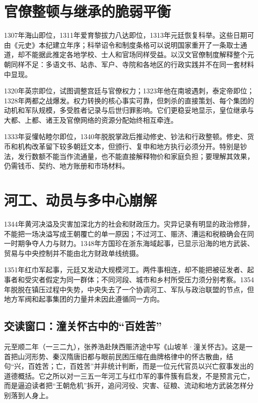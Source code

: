 \section{官僚整顿与继承的脆弱平衡}

1307年海山即位，1311年爱育黎拔力八达即位，1313年元廷恢复科举。这些日期可由《元史》本纪建立年序；科举诏令和制度条格可以说明国家重开了一条取士通道，却不能据此推定各地学校、士人和官场同样受益。以汉文官僚制度解释整个元朝同样不足：多语文书、站赤、军户、寺院和各地区的行政实践并不在同一套材料中显现。

1320年英宗即位，试图调整宫廷与官僚权力；1323年他在南坡遇刺，泰定帝即位；1328年两都之战爆发。权力转换的核心事实可靠，但刺杀的直接策划、每个集团的动机和军队规模，多受胜者记录与后世归罪影响。它们更稳妥地显示，皇位继承与大都、上都、诸王及官僚网络的资源分配始终相互牵连。

1333年妥懽帖睦尔即位，1340年脱脱掌政后推动修史、钞法和行政整顿。修史、货币和机构改革留下较多朝廷文本，但颁行、复申和地方执行必须分开。特别是钞法，发行数额不能当作流通量，也不能直接解释物价和家庭负担；要理解其效果，仍需钱币、契约、地方账册和市场材料。

\section{河工、动员与多中心崩解}

1344年黄河决溢及灾害加深北方的社会和财政压力。灾异记录有明显的政治修辞，不能把一场决溢写成王朝覆亡的单一原因；不过河工、赈济、漕运和税粮确会在同一时期争夺人力与财力。1348年方国珍在浙东海域起事，已显示沿海的地方武装、贸易与中央控制并不能由北方财政单线统摄。

1351年红巾军起事，元廷又发动大规模河工。两件事相连，却不能把被征发者、起事者和受灾者假定为同一群体；不同河段、城市和乡村所受压力须分别考察。1354年脱脱在镇压过程中失势，中央失去了一个协调河工、军队与政治联盟的节点，但地方军阀和起事集团的力量并未因此遵循同一方向。

\subsection{交读窗口：潼关怀古中的“百姓苦”}

元至顺二年（一三二九），张养浩赴陕西赈济途中写《山坡羊·潼关怀古》。这是一首把山河形势、秦汉隋唐旧都与眼前民困压缩在曲牌格律中的怀古散曲，结句“兴，百姓苦；亡，百姓苦”并非统计判断，而是一位元代官员以兴亡叙事发出的道德概括。它之所以对一三五一年河工与红巾军的事件簇有启发，不是预言元亡，而是逼迫读者把“王朝危机”拆开，追问河役、灾害、征粮、流动和地方武装怎样分别落到人身上。

